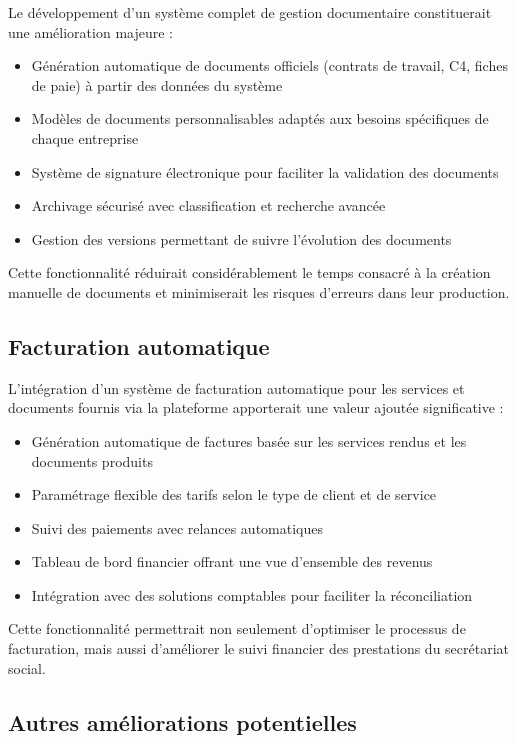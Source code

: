 Le développement d'un système complet de gestion documentaire constituerait une amélioration majeure :

\begin{itemize}
  \item Génération automatique de documents officiels (contrats de travail, C4, fiches de paie) à partir des données du système
  \item Modèles de documents personnalisables adaptés aux besoins spécifiques de chaque entreprise
  \item Système de signature électronique pour faciliter la validation des documents
  \item Archivage sécurisé avec classification et recherche avancée
  \item Gestion des versions permettant de suivre l'évolution des documents
\end{itemize}

Cette fonctionnalité réduirait considérablement le temps consacré à la création manuelle de documents et minimiserait les risques d'erreurs dans leur production.

\subsection{Facturation automatique}

L'intégration d'un système de facturation automatique pour les services et documents fournis via la plateforme apporterait une valeur ajoutée significative :

\begin{itemize}
  \item Génération automatique de factures basée sur les services rendus et les documents produits
  \item Paramétrage flexible des tarifs selon le type de client et de service
  \item Suivi des paiements avec relances automatiques
  \item Tableau de bord financier offrant une vue d'ensemble des revenus
  \item Intégration avec des solutions comptables pour faciliter la réconciliation
\end{itemize}

Cette fonctionnalité permettrait non seulement d'optimiser le processus de facturation, mais aussi d'améliorer le suivi financier des prestations du secrétariat social.

\subsection{Autres améliorations potentielles}

